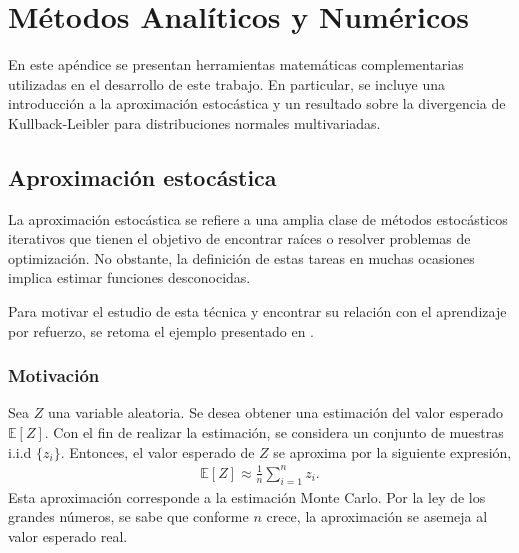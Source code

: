 \chapter{Métodos Analíticos y Numéricos}
\label{appendix:metodos_numericos}

En este apéndice se presentan herramientas matemáticas complementarias utilizadas en el desarrollo de este trabajo. En particular, se incluye una introducción a la aproximación estocástica y un resultado sobre la divergencia de Kullback-Leibler para distribuciones normales multivariadas.

\section{Aproximación estocástica}
La aproximación estocástica se refiere a una amplia clase de métodos estocásticos iterativos que tienen el objetivo de encontrar raíces o resolver problemas de optimización. No obstante, la definición de estas tareas en muchas ocasiones implica estimar funciones desconocidas. \cite{Shiyu2022}

Para motivar el estudio de esta técnica y encontrar su relación con el aprendizaje por refuerzo, se retoma el ejemplo presentado en \cite{Shiyu2022}.

\subsection{Motivación}
Sea $Z$ una variable aleatoria. Se desea obtener una estimación del valor esperado $\mathbb{E}[Z]$. Con el fin de realizar la estimación, se considera un conjunto de muestras i.i.d $\{z_{i}\}$. Entonces, el valor esperado de $Z$ se aproxima por la siguiente expresión,
\begin{align}
    \mathbb{E}[Z] \approx \frac{1}{n}\sum_{i=1}^{n}z_{i}.
    \label{eq:MC_mean}
\end{align}
Esta aproximación corresponde a la estimación Monte Carlo. Por la ley de los grandes números, se sabe que conforme $n$ crece, la aproximación se asemeja al valor esperado real.

